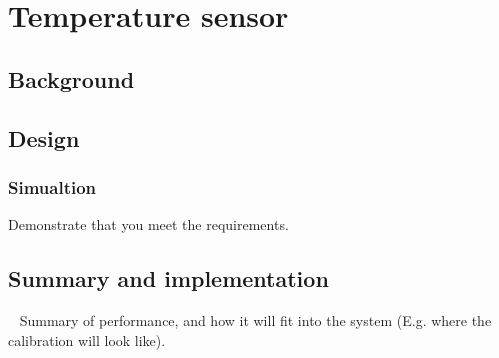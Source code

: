 \chapter{Temperature sensor}

\section{Background} \label{sec:temp_backgroud}

\section{Design}\label{sec:design}

\subsection{Simualtion} \label{sec:temp_simu}
Demonstrate that you meet the requirements. 
\section{Summary and implementation}\
Summary of performance, and how it will fit into the system (E.g. where the calibration will look like). 


